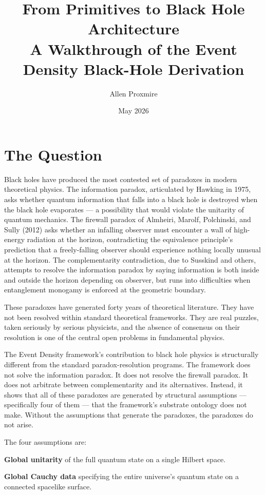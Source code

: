 \documentclass[11pt,a4paper]{article}
\title{\vspace{-1cm}\Large\bfseries From Primitives to Black Hole Architecture\\[6pt]
\large\mdseries A Walkthrough of the Event Density Black-Hole Derivation}
\author{Allen Proxmire}
\date{May 2026}
\begin{document}
\maketitle
\thispagestyle{empty}

\section{The Question}

Black holes have produced the most contested set of paradoxes in modern theoretical physics. The information paradox, articulated by Hawking in 1975, asks whether quantum information that falls into a black hole is destroyed when the black hole evaporates --- a possibility that would violate the unitarity of quantum mechanics. The firewall paradox of Almheiri, Marolf, Polchinski, and Sully (2012) asks whether an infalling observer must encounter a wall of high-energy radiation at the horizon, contradicting the equivalence principle's prediction that a freely-falling observer should experience nothing locally unusual at the horizon. The complementarity contradiction, due to Susskind and others, attempts to resolve the information paradox by saying information is both inside and outside the horizon depending on observer, but runs into difficulties when entanglement monogamy is enforced at the geometric boundary.

These paradoxes have generated forty years of theoretical literature. They have not been resolved within standard theoretical frameworks. They are real puzzles, taken seriously by serious physicists, and the absence of consensus on their resolution is one of the central open problems in fundamental physics.

The Event Density framework's contribution to black hole physics is structurally different from the standard paradox-resolution programs. The framework does not solve the information paradox. It does not resolve the firewall paradox. It does not arbitrate between complementarity and its alternatives. Instead, it shows that all of these paradoxes are generated by structural assumptions --- specifically four of them --- that the framework's substrate ontology does not make. Without the assumptions that generate the paradoxes, the paradoxes do not arise.

The four assumptions are:

\textbf{Global unitarity} of the full quantum state on a single Hilbert space.

\textbf{Global Cauchy data} specifying the entire universe's quantum state on a connected spacelike surface.
\end{document}
